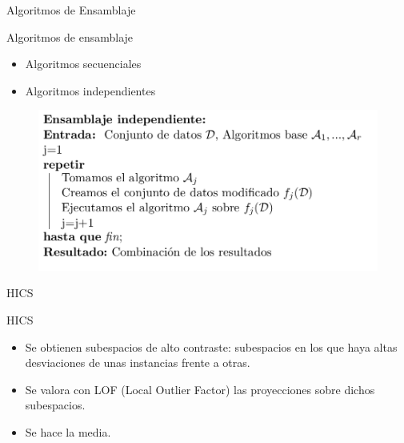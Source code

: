 \documentclass[10pt]{beamer}
\begin{document}
\begin{frame}[fragile]{Algoritmos de Ensamblaje}
\vspace{10px}

\begin{block}{Algoritmos de ensamblaje}
	\begin{itemize}
		\item Algoritmos secuenciales
		\item Algoritmos independientes
	\end{itemize}
\end{block}

\begin{figure}
	\centering
	\includegraphics[scale=0.3]{Imagenes/ensamblaje-independiente}
\end{figure}

\end{frame}

\begin{frame}[fragile]{HICS}
\vspace{10px}
\pause
{}

\begin{block}{HICS}
	\begin{itemize}
		\item Se obtienen subespacios de alto contraste: subespacios en los que haya altas desviaciones de unas instancias frente a otras.
		\pause
		\item Se valora con LOF (Local Outlier Factor) las proyecciones sobre dichos subespacios.
		\pause
		\item Se hace la media.
	\end{itemize}
\end{block}

\end{frame}
\end{document}
